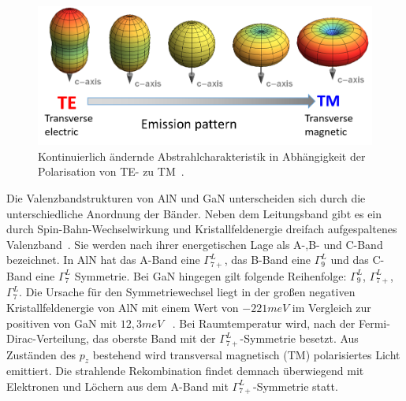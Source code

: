 \begin{figure}[H]
\begin{minipage}[t]{0.49\linewidth}
        \includegraphics[width=\linewidth]{Bilder/martinTETM.png}
        \caption{Kontinuierlich ändernde Abstrahlcharakteristik in Abhängigkeit der Polarisation von TE- zu TM~\cite{martingut}.  }
        \label{fig:martintetm}
    \end{minipage}
\end{figure}
\vspace{0.1cm}
\noindent
Die Valenzbandstrukturen von AlN und GaN unterscheiden sich durch die unterschiedliche Anordnung der Bänder. Neben dem Leitungsband gibt es ein durch Spin-Bahn-Wechselwirkung und Kristallfeldenergie dreifach aufgespaltenes Valenzband~\cite{doi:10.1063/1.117689}. Sie werden nach ihrer energetischen Lage als A-,B- und C-Band bezeichnet. In AlN hat das A-Band eine $\Gamma^{L}_{7+}$, das B-Band eine $\Gamma^{L}_{9}$ und das C-Band eine $\Gamma^{L}_{7}$ Symmetrie. Bei GaN hingegen gilt folgende Reihenfolge:  $\Gamma^{L}_{9}$, $\Gamma^{L}_{7+}$, $\Gamma^{L}_{7}$. Die Ursache für den Symmetriewechsel liegt in der großen negativen Kristallfeldenergie von AlN mit einem Wert von $-221meV$ \cite{PhysRevB.87.235209} im Vergleich zur positiven von GaN mit $12,3meV$ ~\cite{PhysRevB.81.155202}. Bei Raumtemperatur wird, nach der Fermi-Dirac-Verteilung, das oberste Band mit der $\Gamma^{L}_{7+}$-Symmetrie besetzt. Aus Zuständen des $p_z$ bestehend wird transversal magnetisch (TM) polarisiertes Licht emittiert. Die strahlende Rekombination findet demnach überwiegend mit Elektronen und Löchern aus dem A-Band mit $\Gamma^{L}_{7+}$-Symmetrie statt.
